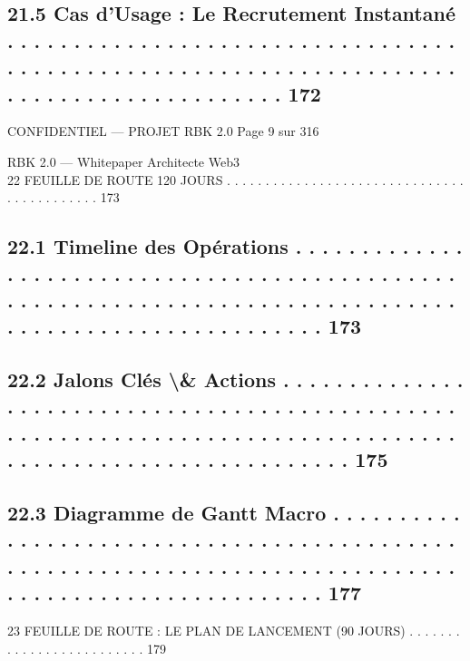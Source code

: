 \subsection{21.5    Cas d’Usage : Le Recrutement Instantané . . . . . . . . . . . . . . . . . . . . . . . . . . . . . . . . . . . . . . . . . . . . . . . . . . . . . . . . . . . . . . . . . . . . . . . . . . . . . . . . . . . . . . . . . 172}
\vspace{0.5em}
\vspace{0.5em}
\vspace{0.5em}
\begin{confidential}CONFIDENTIEL — PROJET RBK 2.0                                                                                Page 9 sur 316\end{confidential}
RBK 2.0 — Whitepaper Architecte Web3\\
\vspace{0.5em}
\vspace{0.5em}
22    FEUILLE DE ROUTE 120 JOURS . . . . . . . . . . . . . . . . . . . . . . . . . . . . . . . . . . . . . . . . . . . 173\\
\subsection{22.1    Timeline des Opérations . . . . . . . . . . . . . . . . . . . . . . . . . . . . . . . . . . . . . . . . . . . . . . . . . . . . . . . . . . . . . . . . . . . . . . . . . . . . . . . . . . . . . . . . . . . . . . . . . . . . . . . . . 173}
\subsection{22.2    Jalons Clés \textbackslash{}& Actions . . . . . . . . . . . . . . . . . . . . . . . . . . . . . . . . . . . . . . . . . . . . . . . . . . . . . . . . . . . . . . . . . . . . . . . . . . . . . . . . . . . . . . . . . . . . . . . . . . . . . . . . . . . . 175}
\subsection{22.3    Diagramme de Gantt Macro . . . . . . . . . . . . . . . . . . . . . . . . . . . . . . . . . . . . . . . . . . . . . . . . . . . . . . . . . . . . . . . . . . . . . . . . . . . . . . . . . . . . . . . . . . . . . . . . . . . . . . 177}
\vspace{0.5em}
23    FEUILLE DE ROUTE : LE PLAN DE LANCEMENT (90 JOURS) . . . . . . . . . . . . . . . . . . . . . . . . . 179\\
